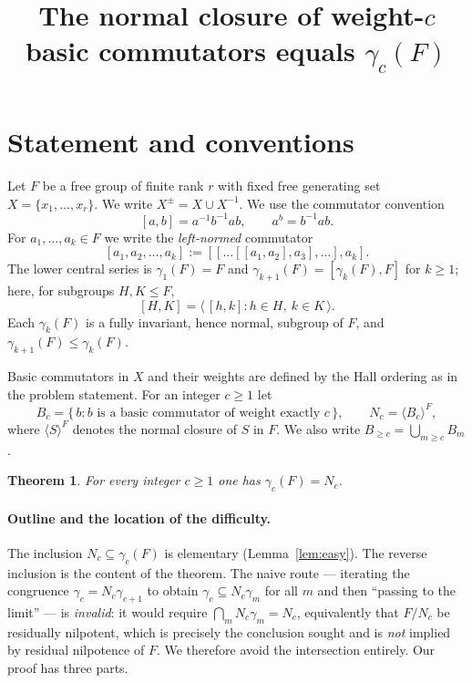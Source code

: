 \documentclass{amsart}
\newtheorem{theorem}{Theorem}
\theoremstyle{definition}
\theoremstyle{remark}
\begin{document}
\title{The normal closure of weight-$c$ basic commutators equals $\gamma_c(F)$}
\maketitle

\section{Statement and conventions}

Let $F$ be a free group of finite rank $r$ with fixed free generating set
$X=\{x_1,\dots,x_r\}$. We write $X^{\pm}=X\cup X^{-1}$. We use the commutator
convention
\[
[a,b]=a^{-1}b^{-1}ab ,\qquad a^{b}=b^{-1}ab .
\]
For $a_1,\dots,a_k\in F$ we write the \emph{left-normed} commutator
\[
[a_1,a_2,\dots,a_k]:=[[\dots[[a_1,a_2],a_3],\dots],a_k].
\]
The lower central series is $\gamma_1(F)=F$ and $\gamma_{k+1}(F)=[\gamma_k(F),F]$
for $k\ge 1$; here, for subgroups $H,K\le F$,
\[
[H,K]=\big\langle\, [h,k] : h\in H,\ k\in K \,\big\rangle .
\]
Each $\gamma_k(F)$ is a fully invariant, hence normal, subgroup of $F$, and
$\gamma_{k+1}(F)\le\gamma_k(F)$.

Basic commutators in $X$ and their weights are defined by the Hall ordering as in
the problem statement. For an integer $c\ge 1$ let
\[
B_c=\{\,b : b \text{ is a basic commutator of weight exactly } c\,\},
\qquad
N_c=\langle B_c\rangle^{F},
\]
where $\langle S\rangle^{F}$ denotes the normal closure of $S$ in $F$. We also
write $B_{\ge c}=\bigcup_{m\ge c}B_m$.

\begin{theorem}\label{thm:main}
For every integer $c\ge 1$ one has $\gamma_c(F)=N_c$.
\end{theorem}

\paragraph{Outline and the location of the difficulty.}
The inclusion $N_c\subseteq\gamma_c(F)$ is elementary
(Lemma~\ref{lem:easy}). The reverse inclusion is the content of the theorem. The
naive route --- iterating the congruence $\gamma_c=N_c\gamma_{c+1}$ to obtain
$\gamma_c\subseteq N_c\gamma_m$ for all $m$ and then ``passing to the limit'' ---
is \emph{invalid}: it would require $\bigcap_{m}N_c\gamma_m=N_c$, equivalently
that $F/N_c$ be residually nilpotent, which is precisely the conclusion sought and
is \emph{not} implied by residual nilpotence of $F$. We therefore avoid the
intersection entirely. Our proof has three parts.
\end{document}
